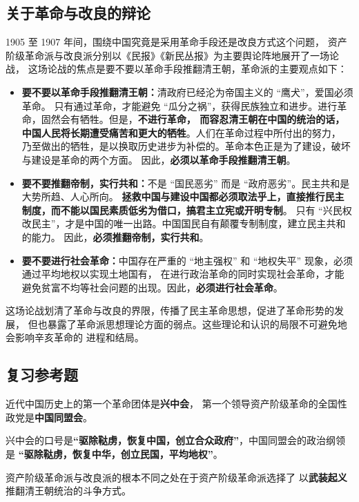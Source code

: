 \documentclass[10pt, UTF8]{book} %
\begin{document}
\subsection{关于革命与改良的辩论}

1905 至 1907 年间，围绕中国究竟是采用革命手段还是改良方式这个问题，
资产阶级革命派与改良派分别以《民报》《新民丛报》为主要舆论阵地展开了一场论战，
这场论战的焦点是要不要以革命手段推翻清王朝，革命派的主要观点如下：
\begin{itemize}[itemsep=0pt]
    \item \textbf{要不要以革命手段推翻清王朝：}清政府已经沦为帝国主义的 “鹰犬”，爱国必须革命。
    只有通过革命，才能避免 “瓜分之祸”，获得民族独立和进步。进行革命，固然会有牺牲。但是，\textbf{不进行革命，
    而容忍清王朝在中国的统治的话，中国人民将长期遭受痛苦和更大的牺牲}。人们在革命过程中所付出的努力，
    乃至做出的牺牲，是以换取历史进步为补偿的。革命本色正是为了建设，破坏与建设是革命的两个方面。
    因此，\textbf{必须以革命手段推翻清王朝}。
    \item \textbf{要不要推翻帝制，实行共和：}不是 “国民恶劣” 而是 “政府恶劣”。民主共和是大势所趋、人心所向。
    \textbf{拯救中国与建设中国都必须取法乎上，直接推行民主制度，而不能以国民素质低劣为借口，搞君主立宪或开明专制}。
    只有 “兴民权改民主”，才是中国的唯一出路。中国国民自有颠覆专制制度，建立民主共和的能力。
    因此，\textbf{必须推翻帝制，实行共和}。
    \item \textbf{要不要进行社会革命：}中国存在严重的 “地主强权” 和 “地权失平” 现象，必须通过平均地权以实现土地国有，
    在进行政治革命的同时实现社会革命，才能避免贫富不均等社会问题的出现。因此，\textbf{必须进行社会革命}。
\end{itemize}
这场论战划清了革命与改良的界限，传播了民主革命思想，促进了革命形势的发展，
但也暴露了革命派思想理论方面的弱点。这些理论和认识的局限不可避免地会影响辛亥革命的
进程和结局。

\subsection{复习参考题}

\begin{example}
    近代中国历史上的第一个革命团体是\textbf{兴中会}，
    第一个领导资产阶级革命的全国性政党是\textbf{中国同盟会}。
\end{example}
\begin{example}
    兴中会的口号是\textbf{“驱除鞑虏，恢复中国，创立合众政府”}，中国同盟会的政治纲领是
    \textbf{“驱除鞑虏，恢复中华，创立民国，平均地权”}。
\end{example}
\begin{example}
    资产阶级革命派与改良派的根本不同之处在于资产阶级革命派选择了
    以\textbf{武装起义}推翻清王朝统治的斗争方式。
\end{example}
\end{document}
